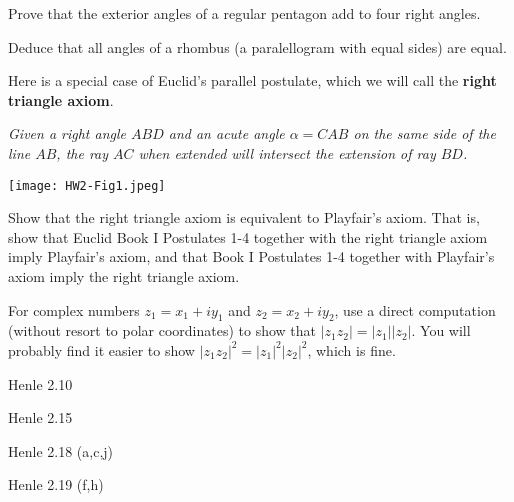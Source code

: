 \documentclass[minion]{homework}
\begin{document}
\begin{problems}

\problem Prove that the exterior angles of a regular pentagon add to four right angles.

\problem Deduce that all angles of a rhombus (a paralellogram with equal sides) are equal.

\problem Here is a special case of Euclid's parallel postulate, which we will call the
\textbf{right triangle axiom}.

\textit{Given a right angle $ABD$ and an acute angle $\alpha = CAB$ on the same side of the line $AB$,
the ray $AC$ when extended will intersect the extension of ray $BD$.}


\hfil\texttt{[image: HW2-Fig1.jpeg]}

Show that the right triangle axiom is equivalent to Playfair's axiom. That is, show that Euclid Book I Postulates 1-4 together with the right triangle axiom imply Playfair's axiom, and that 
Book I Postulates 1-4 together with Playfair's axiom imply the right triangle axiom.

\problem For complex numbers $z_1=x_1+iy_1$ and $z_2=x_2+iy_2$, use a direct computation (without resort to polar coordinates) to show that $|z_1z_2|=|z_1||z_2|$.
You will probably find it easier to show
$|z_1z_2|^2=|z_1|^2|z_2|^2$, which is fine.

\problem Henle 2.10

\problem Henle 2.15

\problem Henle 2.18 (a,c,j)

\problem Henle 2.19 (f,h)


\end{problems}
\end{document}
